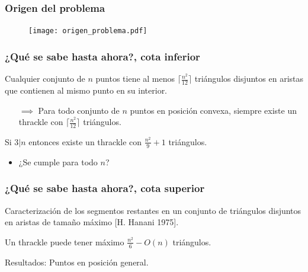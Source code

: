 \documentclass{beamer}
\begin{document}
\begin{frame}
  \frametitle{Origen del problema}
  \begin{figure}[htb]
    \texttt{[image: origen\_problema.pdf]}
  \end{figure}
\end{frame}

\begin{frame}
  \frametitle{¿Qué se sabe hasta ahora?, cota inferior}
  Cualquier conjunto de $n$ puntos tiene al menos $\lceil\frac{n^2}{12}\rceil$ triángulos
  disjuntos en aristas que contienen al mismo punto en su interior.
  \begin{figure}[htb]
    \def\svgwidth{3cm}
    
  \end{figure}
  \begin{itemize}[leftmargin=2cm]
    \item[$\implies$] Para todo conjunto de $n$ puntos en posición convexa, siempre existe un
      thrackle con $\lceil\frac{n^2}{12}\rceil$ triángulos.
  \end{itemize}
  Si $3|n$ entonces existe un thrackle con $\frac{n^2}{9}+1$ triángulos.
  \begin{itemize}[leftmargin=1cm]
    \item ¿Se cumple para todo $n$?
  \end{itemize}
\end{frame}

\begin{frame}
  \frametitle{¿Qué se sabe hasta ahora?, cota superior}
  Caracterización de los segmentos restantes en un conjunto de triángulos
  disjuntos en aristas de tamaño máximo [H. Hanani 1975].
  \begin{figure}[htb]
    \scriptsize
    
  \end{figure}
  Un thrackle puede tener máximo $\frac{n^2}{6}-O(n)$ triángulos.
\end{frame}

\begin{frame}[c]
  \begin{center}
    \Huge Resultados: Puntos en posición general.
  \end{center}
\end{frame}
\end{document}
